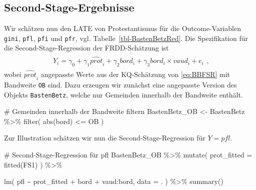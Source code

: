 \documentclass[
  a4paper,
  DIV=11,
  oneside]{scrreprt}
\newenvironment{Shaded}{\begin{snugshade}}{\end{snugshade}}
\newcommand{\AttributeTok}[1]{\textcolor[rgb]{0.40,0.45,0.13}{#1}}
\newcommand{\CommentTok}[1]{\textcolor[rgb]{0.37,0.37,0.37}{#1}}
\newcommand{\FunctionTok}[1]{\textcolor[rgb]{0.28,0.35,0.67}{#1}}
\newcommand{\NormalTok}[1]{\textcolor[rgb]{0.00,0.23,0.31}{#1}}
\newcommand{\OtherTok}[1]{\textcolor[rgb]{0.00,0.23,0.31}{#1}}
\newcommand{\SpecialCharTok}[1]{\textcolor[rgb]{0.37,0.37,0.37}{#1}}
\begin{document}
\subsection{Second-Stage-Ergebnisse}\label{second-stage-ergebnisse}

Wir schätzen nun den LATE von Protestantismus für die Outcome-Variablen
\texttt{gini}, \texttt{pfl}, \texttt{pfi} und \texttt{pfr}, vgl.
Tabelle~\ref{tbl-BastenBetzRed}. Die Spezifikation für die
Second-Stage-Regression der FRDD-Schätzung ist \begin{align}
  \begin{split}
    Y_i = \gamma_0 + \gamma_1 \widehat{prot}_i +  \gamma_2 bord_i + \gamma_3 bord_i  \times vaud_i + e_i
  \end{split},
\end{align} wobei \(\widehat{prot}_i\) angepasste Werte aus der
KQ-Schätzung von \eqref{eq:BBFSR} mit Bandweite \texttt{OB} sind. Dazu
erzeugen wir zunächst eine angepasste Version des Objekts
\texttt{BastenBetz}, welche nur Gemeinden innerhalb der Bandweite
enthält.

\begin{Shaded}
\begin{Highlighting}[]
\CommentTok{\# Gemeinden innerhalb der Bandweite filtern}
\NormalTok{BastenBetz\_OB }\OtherTok{\textless{}{-}}\NormalTok{ BastenBetz }\SpecialCharTok{\%\textgreater{}\%} 
  \FunctionTok{filter}\NormalTok{(}
    \FunctionTok{abs}\NormalTok{(bord) }\SpecialCharTok{\textless{}=}\NormalTok{ OB}
\NormalTok{  )}
\end{Highlighting}
\end{Shaded}

Zur Illustration schätzen wir nun die Second-Stage-Regression für
\(Y = pfl\).

\begin{Shaded}
\begin{Highlighting}[]
\CommentTok{\# Second{-}Stage{-}Regression für \textasciigrave{}pfl\textasciigrave{}}
\NormalTok{BastenBetz\_OB }\SpecialCharTok{\%\textgreater{}\%} 
  \FunctionTok{mutate}\NormalTok{(}
    \AttributeTok{prot\_fitted =} \FunctionTok{fitted}\NormalTok{(FS1)}
\NormalTok{    ) }\SpecialCharTok{\%\textgreater{}\%}

\FunctionTok{lm}\NormalTok{(}
\NormalTok{  pfl }\SpecialCharTok{\textasciitilde{}}\NormalTok{ prot\_fitted }\SpecialCharTok{+}\NormalTok{ bord }\SpecialCharTok{+}\NormalTok{ vaud}\SpecialCharTok{:}\NormalTok{bord, }
  \AttributeTok{data =}\NormalTok{ .}
\NormalTok{) }\SpecialCharTok{\%\textgreater{}\%} 
  \FunctionTok{summary}\NormalTok{()}
\end{Highlighting}
\end{Shaded}
\end{document}
